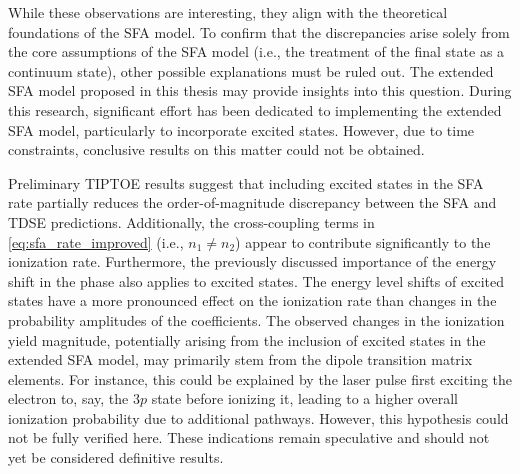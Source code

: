 While these observations are interesting, they align with the theoretical foundations of the SFA model.
To confirm that the discrepancies arise solely from the core assumptions of the SFA model (i.e., the treatment of the final state as a continuum state), other possible explanations must be ruled out.
The extended SFA model proposed in this thesis may provide insights into this question.
During this research, significant effort has been dedicated to implementing the extended SFA model, particularly to incorporate excited states.
However, due to time constraints, conclusive results on this matter could not be obtained.

Preliminary TIPTOE results suggest that including excited states in the SFA rate partially reduces the order-of-magnitude discrepancy between the SFA and TDSE predictions.
Additionally, the cross-coupling terms in \eqref{eq:sfa_rate_improved} (i.e., $n_1 \neq n_2$) appear to contribute significantly to the ionization rate.
Furthermore, the previously discussed importance of the energy shift in the phase also applies to excited states.
The energy level shifts of excited states have a more pronounced effect on the ionization rate than changes in the probability amplitudes of the coefficients.
The observed changes in the ionization yield magnitude, potentially arising from the inclusion of excited states in the extended SFA model, may primarily stem from the dipole transition matrix elements.
For instance, this could be explained by the laser pulse first exciting the electron to, say, the $3p$ state before ionizing it, leading to a higher overall ionization probability due to additional pathways.
However, this hypothesis could not be fully verified here.
These indications remain speculative and should not yet be considered definitive results.





